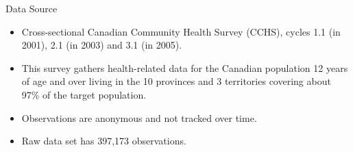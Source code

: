 \begin{frame}{Data Source}
\begin{itemize}
    \item Cross-sectional Canadian Community Health Survey (CCHS), cycles 1.1 (in 2001), 2.1 (in 2003) and 3.1 (in 2005).
    \item This survey gathers health-related data for the Canadian population 12 years of age and over living in the 10 provinces and 3 territories covering about 97\% of the target population.
    \item Observations are anonymous and not tracked over time.
    \item Raw data set has 397,173 observations.

\end{itemize}
\end{frame}